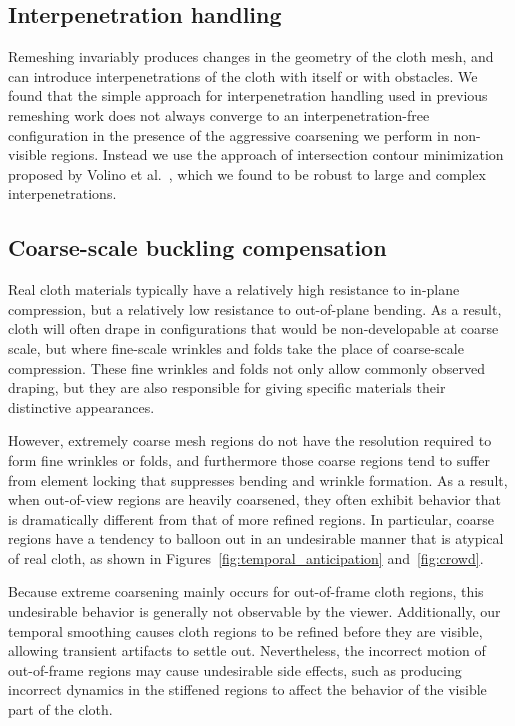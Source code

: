 \documentclass[10pt,journal,compsoc,twoside]{TexInputs/IEEEtran}
\begin{document}
\subsection{Interpenetration handling}

Remeshing invariably produces changes in the geometry of the cloth mesh, and can introduce interpenetrations of the cloth with itself or with obstacles.
We found that the simple approach for interpenetration handling used in previous remeshing work \cite{Narain:2012:AAR} does not always converge to an interpenetration-free configuration in the presence of the aggressive coarsening we perform in non-visible regions.
Instead we use the approach of intersection contour minimization proposed by Volino et al.~\cite{Volino:2006:RSC}, which we found to be robust to large and complex interpenetrations.

\subsection{Coarse-scale buckling compensation}

Real cloth materials typically have a relatively high resistance to in-plane
compression, but a relatively low resistance to out-of-plane bending. As a
result, cloth will often drape in configurations that would be non-developable
at coarse scale, but where fine-scale wrinkles and folds take the place of
coarse-scale compression. These fine wrinkles and folds not only allow commonly
observed draping, but they are also responsible for giving specific materials
their distinctive appearances.

However, extremely coarse mesh regions do not have the resolution required to
form fine wrinkles or folds, and furthermore those coarse regions tend to
suffer from element locking that suppresses bending and wrinkle formation. As a
result, when out-of-view regions are heavily coarsened, they often exhibit
behavior that is dramatically different from that of more refined regions. In
particular, coarse regions have a tendency to balloon out in an undesirable
manner that is atypical of real cloth, as shown in
Figures~\ref{fig:temporal_anticipation} and~\ref{fig:crowd}.

Because extreme coarsening mainly occurs for out-of-frame cloth regions, this
undesirable behavior is generally not observable by the viewer. Additionally,
our temporal smoothing causes cloth regions to be refined before they are
visible, allowing transient artifacts to settle out.  Nevertheless, 
the incorrect motion of out-of-frame regions may cause undesirable side effects, such as producing incorrect dynamics in the stiffened regions to affect the behavior of the visible part of the cloth.
\end{document}
